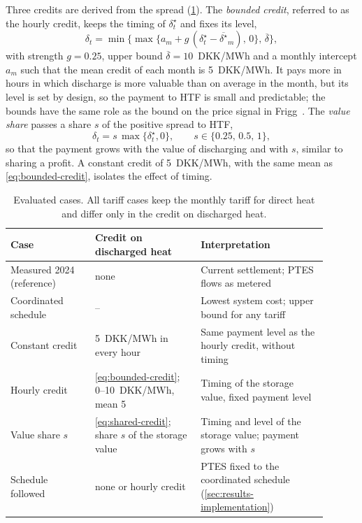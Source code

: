 Three credits are derived from the spread (\cref{tab:cases}). The \emph{bounded credit}, referred to as the hourly credit, keeps the timing of $\delta^{\star}_t$ and fixes its level,
\begin{equation}
\delta_t = \min\Big\{\max\big\{a_m + g\,(\delta^{\star}_t-\overline{\delta^{\star}}_m),\,0\big\},\,\overline\delta\Big\},
\label{eq:bounded-credit}
\end{equation}
with strength $g=0.25$, upper bound $\overline\delta=10$~DKK/MWh and a monthly intercept $a_m$ such that the mean credit of each month is 5~DKK/MWh. It pays more in hours in which discharge is more valuable than on average in the month, but its level is set by design, so the payment to HTF is small and predictable; the bounds have the same role as the bound on the price signal in Frigg~\cite{schledorn2024frigg}. The \emph{value share} passes a share $s$ of the positive spread to HTF,
\begin{equation}
\delta_t = s\,\max\{\delta^{\star}_t,0\},\qquad s\in\{0.25,\,0.5,\,1\},
\label{eq:shared-credit}
\end{equation}
so that the payment grows with the value of discharging and with $s$, similar to sharing a profit. A constant credit of 5~DKK/MWh, with the same mean as \cref{eq:bounded-credit}, isolates the effect of timing.

\begin{table}[!htb]
    \centering
    \small
    \caption{Evaluated cases. All tariff cases keep the monthly tariff for direct heat and differ only in the credit on discharged heat.}
    \label{tab:cases}
    \begin{tabular}{p{0.24\linewidth}p{0.30\linewidth}p{0.36\linewidth}}
        \toprule
        Case & Credit on discharged heat & Interpretation \\
        \midrule
        Measured 2024 (reference) & none & Current settlement; PTES flows as metered \\
        Coordinated schedule & -- & Lowest system cost; upper bound for any tariff \\
        Constant credit & 5~DKK/MWh in every hour & Same payment level as the hourly credit, without timing \\
        Hourly credit & \cref{eq:bounded-credit}; 0--10~DKK/MWh, mean 5 & Timing of the storage value, fixed payment level \\
        Value share $s$ & \cref{eq:shared-credit}; share $s$ of the storage value & Timing and level of the storage value; payment grows with $s$ \\
        Schedule followed & none or hourly credit & PTES fixed to the coordinated schedule (\cref{sec:results-implementation}) \\
        \bottomrule
    \end{tabular}
\end{table}

